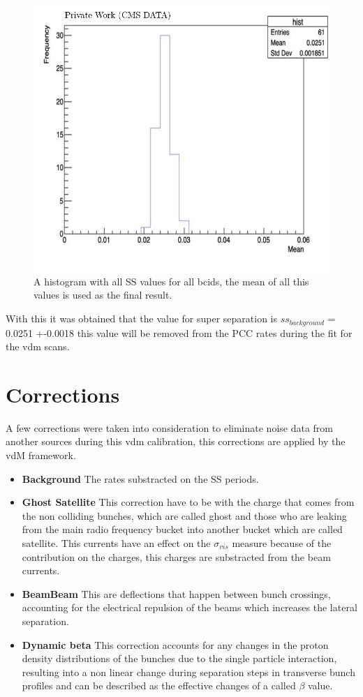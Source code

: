 \begin{figure}[H]
    \centering
    \includegraphics[height = 0.6 \textwidth ,width=1\textwidth]{ssthist.png}
    \caption[Histogram of all SS values]{A histogram with all SS values for all bcids, the mean of all this values is used as the final result.}
    \label{fig:Histogram}
\end{figure}

With this it was obtained that the value for super separation is $ss_{background}$ = 0.0251 +-0.0018 this value will be removed from the PCC rates during the fit for the vdm scans. 

\section{Corrections}

A few corrections were taken into consideration to eliminate noise data from another sources during this vdm calibration, this corrections are applied by the vdM framework. 

\begin{itemize}
  \item \textbf{Background} The rates substracted on the SS periods.
  \item \textbf {Ghost Satellite} This correction have to be with the charge that comes from the non colliding bunches, which are called ghost and those who are leaking from the main radio frequency bucket into another bucket which are called satellite. This currents have an effect on the $\sigma_{vis}$ measure because of the contribution on the charges, this charges are substracted from the beam currents.  \cite{ghost}
  \item \textbf{BeamBeam} This are deflections that happen between bunch crossings, accounting for the electrical repulsion of the beams which increases the lateral separation.   \cite{beambeam}
  \item \textbf{Dynamic beta} This correction accounts for any changes in the proton density distributions of the bunches due to the single particle interaction, resulting into a non linear change during separation steps in transverse bunch profiles and can be described as the effective changes of a called $\beta$ value. \cite{LHClum}
\end{itemize}


